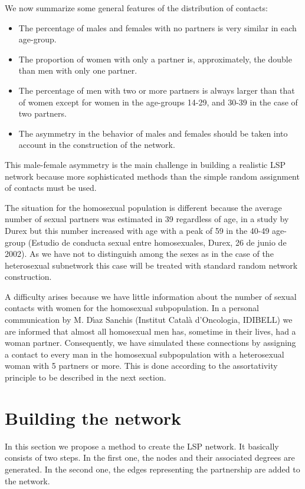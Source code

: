We now summarize some general features of the distribution of contacts:

\begin{itemize}
	\item The percentage of males and females with no partners is very similar in each age-group.
	\item The proportion of women with only a partner is, approximately,
the double than men with only one partner. 
	\item The percentage of men with two or more partners is always larger than that of women except for women in the age-groups 14-29, and 30-39 in the case of two partners.
	\item The asymmetry in the behavior of males and females should be taken into account in the construction of the network.
\end{itemize}

This male-female asymmetry is the main challenge in building a realistic LSP network because more sophisticated methods than the simple random assignment of contacts must be used.

The situation for the homosexual population is different because the average number of sexual partners was estimated in 39 regardless of age, in a study by Durex but this number increased with age with a peak of 59 in the 40-49 age-group (Estudio de conducta sexual entre homosexuales, Durex, 26 de junio de 2002).  As we have not to distinguish among the sexes as in the case of the heterosexual subnetwork this case will be treated with standard random network construction.

A difficulty arises because we have little information about the number of sexual contacts with women for the homosexual subpopulation. In a personal communication by M. D\'{\i}az Sanchis (Institut Catal\`{a} d'Oncologia, IDIBELL) we are informed that almost all homosexual men has, sometime in their lives, had a woman partner.  Consequently, we have simulated these connections by assigning a contact to every man in the homosexual subpopulation with a heterosexual woman with 5 partners or more. This is done according to the assortativity principle to be described in the next section.

\section{Building the network}

In this section we propose a method to create the LSP network. It basically
consists of two steps. In the first one, the nodes and their associated degrees are generated. In the second one, the edges representing the partnership are added to the network.

